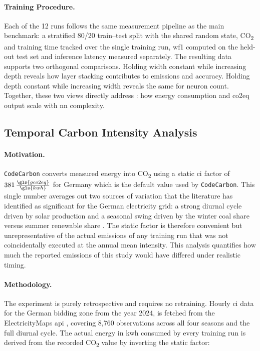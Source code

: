\paragraph{Training Procedure.}
Each of the 12 runs follows the same measurement pipeline as the main benchmark: a stratified 80/20 train--test split with the shared random state, CO\textsubscript{2} and training time tracked over the single training run, \gls{wf1} computed on the held-out test set and inference latency measured separately. The resulting data supports two orthogonal comparisons. Holding width constant while increasing depth reveals how layer stacking contributes to emissions and accuracy. Holding depth constant while increasing width reveals the same for neuron count. Together, these two views directly address : how energy consumption and \gls{co2eq} output scale with \gls{nn} complexity.

\subsection{Temporal Carbon Intensity Analysis}
\label{design_carbon_intensity}\label{exp:4}

\paragraph{Motivation.}
\texttt{CodeCarbon} converts measured energy into CO\textsubscript{2} using a static \gls{ci} factor of $381\,\frac{\gls{gco2eq}}{\gls{kwh}}$ for Germany which is the default value used by \texttt{CodeCarbon}. This single number averages out two sources of variation that the literature has identified as significant for the German electricity grid: a strong diurnal cycle driven by solar production and a seasonal swing driven by the winter coal share versus summer renewable share \cite{dodgeMeasuringCarbonIntensity2022}. The static factor is therefore convenient but unrepresentative of the actual emissions of any training run that was not coincidentally executed at the annual mean intensity. This analysis quantifies how much the reported emissions of this study would have differed under realistic timing.

\paragraph{Methodology.}
The experiment is purely retrospective and requires no retraining. Hourly \gls{ci} data for the German bidding zone from the year 2024, is fetched from the ElectricityMaps \gls{api} \cite{electricityMapsAPI2025}, covering 8{,}760 observations across all four seasons and the full diurnal cycle. The actual energy in \gls{kwh} consumed by every training run is derived from the recorded CO\textsubscript{2} value by inverting the static factor:

